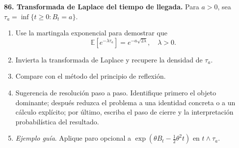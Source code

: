 \documentclass[11pt, letterpaper]{article}
\begin{document}
\newpage
\begin{ejercicio}
    \textbf{86. Transformada de Laplace del tiempo de llegada.} Para $a>0$, sea $\tau_{a}=\inf\{t\ge 0:B_{t}=a\}$.
    \begin{enumerate}
        \item Use la martingala exponencial para demostrar que
        \[ \mathbb{E}[e^{-\lambda\tau_{a}}]=e^{-a\sqrt{2\lambda}}, \quad \lambda>0. \]
        \item Invierta la transformada de Laplace y recupere la densidad de $\tau_{a}$.
        \item Compare con el método del principio de reflexión.
        \item Sugerencia de resolución paso a paso. Identifique primero el objeto dominante; después reduzca el problema a una identidad concreta o a un cálculo explícito; por último, escriba el paso de cierre y la interpretación probabilística del resultado.
        \item \textit{Ejemplo guía}. Aplique paro opcional a $\exp(\theta B_{t}-\frac{1}{2}\theta^{2}t)$ en $t\wedge\tau_{a}$.
    \end{enumerate}
\end{ejercicio}

\vspace{5mm}
\end{document}
